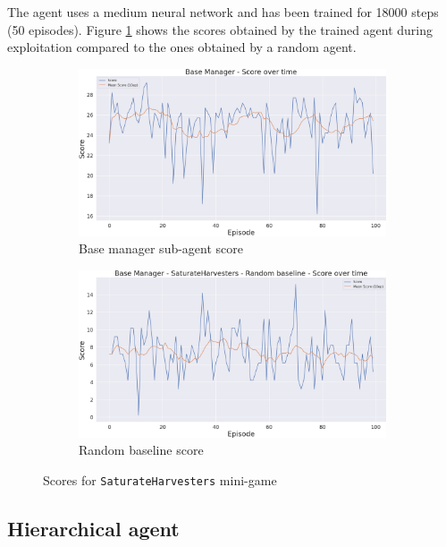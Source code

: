 The agent uses a medium neural network and has been trained for 18000 steps (50 episodes). Figure \ref{fig:SaturateHarvesters_scores} shows the scores obtained by the trained agent during exploitation compared to the ones obtained by a random agent.

\begin{figure}[t]
    \centering
    \begin{subfigure}[b]{0.495\textwidth}
        \includegraphics[width=1\textwidth]{figs/multi_dqn_base_manager/exploit/score.png}
        \caption{Base manager sub-agent score}
    \end{subfigure}
    \begin{subfigure}[b]{0.495\textwidth}
        \includegraphics[width=1\textwidth]{figs/multi_random_base_manager/exploit/score.png}
        \caption{Random baseline score}
    \end{subfigure}
    \caption{Scores for \texttt{SaturateHarvesters} mini-game}
    \label{fig:SaturateHarvesters_scores}
\end{figure}

\subsection{Hierarchical agent}
\label{sec:hierarchical_agent}

